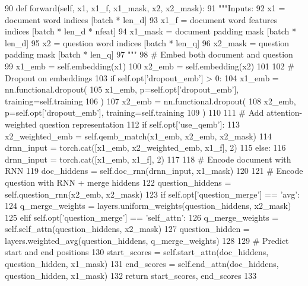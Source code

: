 \begin{DoxyCode}
90     \textcolor{keyword}{def }forward(self, x1, x1\_f, x1\_mask, x2, x2\_mask):
91         \textcolor{stringliteral}{"""Inputs:}
92 \textcolor{stringliteral}{        x1 = document word indices             [batch * len\_d]}
93 \textcolor{stringliteral}{        x1\_f = document word features indices  [batch * len\_d * nfeat]}
94 \textcolor{stringliteral}{        x1\_mask = document padding mask        [batch * len\_d]}
95 \textcolor{stringliteral}{        x2 = question word indices             [batch * len\_q]}
96 \textcolor{stringliteral}{        x2\_mask = question padding mask        [batch * len\_q]}
97 \textcolor{stringliteral}{        """}
98         \textcolor{comment}{# Embed both document and question}
99         x1\_emb = self.embedding(x1)
100         x2\_emb = self.embedding(x2)
101 
102         \textcolor{comment}{# Dropout on embeddings}
103         \textcolor{keywordflow}{if} self.opt[\textcolor{stringliteral}{'dropout\_emb'}] > 0:
104             x1\_emb = nn.functional.dropout(
105                 x1\_emb, p=self.opt[\textcolor{stringliteral}{'dropout\_emb'}], training=self.training
106             )
107             x2\_emb = nn.functional.dropout(
108                 x2\_emb, p=self.opt[\textcolor{stringliteral}{'dropout\_emb'}], training=self.training
109             )
110 
111         \textcolor{comment}{# Add attention-weighted question representation}
112         \textcolor{keywordflow}{if} self.opt[\textcolor{stringliteral}{'use\_qemb'}]:
113             x2\_weighted\_emb = self.qemb\_match(x1\_emb, x2\_emb, x2\_mask)
114             drnn\_input = torch.cat([x1\_emb, x2\_weighted\_emb, x1\_f], 2)
115         \textcolor{keywordflow}{else}:
116             drnn\_input = torch.cat([x1\_emb, x1\_f], 2)
117 
118         \textcolor{comment}{# Encode document with RNN}
119         doc\_hiddens = self.doc\_rnn(drnn\_input, x1\_mask)
120 
121         \textcolor{comment}{# Encode question with RNN + merge hiddens}
122         question\_hiddens = self.question\_rnn(x2\_emb, x2\_mask)
123         \textcolor{keywordflow}{if} self.opt[\textcolor{stringliteral}{'question\_merge'}] == \textcolor{stringliteral}{'avg'}:
124             q\_merge\_weights = layers.uniform\_weights(question\_hiddens, x2\_mask)
125         \textcolor{keywordflow}{elif} self.opt[\textcolor{stringliteral}{'question\_merge'}] == \textcolor{stringliteral}{'self\_attn'}:
126             q\_merge\_weights = self.self\_attn(question\_hiddens, x2\_mask)
127         question\_hidden = layers.weighted\_avg(question\_hiddens, q\_merge\_weights)
128 
129         \textcolor{comment}{# Predict start and end positions}
130         start\_scores = self.start\_attn(doc\_hiddens, question\_hidden, x1\_mask)
131         end\_scores = self.end\_attn(doc\_hiddens, question\_hidden, x1\_mask)
132         \textcolor{keywordflow}{return} start\_scores, end\_scores
133 \end{DoxyCode}


